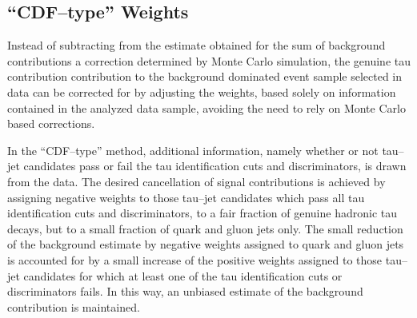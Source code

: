 \subsection{``CDF--type'' Weights}
\label{secBgEstFakeRate_frCDFtypeWeights}
%
%
Instead of subtracting from the estimate obtained for the sum of background
contributions a correction determined by Monte Carlo simulation, the genuine tau
contribution contribution to the background dominated event sample selected in
data can be corrected for by adjusting the weights, based solely on information
contained in the analyzed data sample, avoiding the need to rely on Monte
Carlo based corrections.

In the ``CDF--type'' method, additional information, namely whether or not
tau--jet candidates pass or fail the tau identification cuts and discriminators,
is drawn from the data.  The desired cancellation of signal contributions is
achieved by assigning negative weights to those tau--jet candidates which pass
all tau identification cuts and discriminators, \ie to a fair fraction of
genuine hadronic tau decays, but to a small fraction of quark and gluon jets
only.  The small reduction of the background estimate by negative weights
assigned to quark and gluon jets is accounted for by a small increase of the
positive weights assigned to those tau--jet candidates for which at least one of
the tau identification cuts or discriminators fails.  In this way, an unbiased
estimate of the background contribution is maintained.

